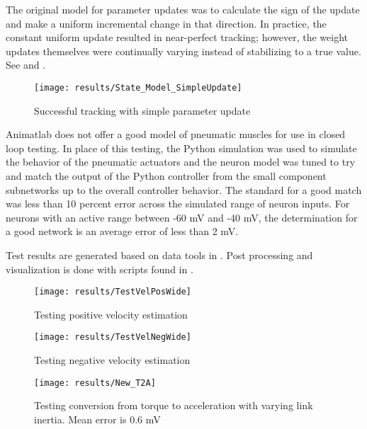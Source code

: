 
The original model for parameter updates was to calculate the sign of the update
and make a uniform incremental change in that direction. In practice, the constant uniform update
resulted in near-perfect tracking; however, the weight updates themselves were continually varying instead of stabilizing to a true value. See  and .

\begin{figure}
\centering
\texttt{[image: results/State\_Model\_SimpleUpdate]}
\caption{Successful tracking with simple parameter update}
\label{fig:StateUpdateSimple}
\end{figure}


Animatlab does not offer a good model of pneumatic muscles for use in closed loop testing. In place of this testing, the Python simulation was used to simulate the behavior of the pneumatic actuators and the neuron model was tuned to try and match the output of the Python controller from the small component subnetworks up to the overall controller behavior. The standard for a good match was less than 10 percent error across the simulated range of neuron inputs. For neurons with an active range between -60 mV and -40 mV, the determination for a good network is an average error of less than 2 mV. 


Test results are generated based on data tools in . Post processing and visualization is done with scripts found in .

\begin{figure}
\centering
\texttt{[image: results/TestVelPosWide]}
\caption{Testing positive velocity estimation}
\label{fig:TestVelPos}
\end{figure}

\begin{figure}
\centering
\texttt{[image: results/TestVelNegWide]}
\caption{Testing negative velocity estimation}
\label{fig:TestVelNeg}
\end{figure}

\begin{figure}
\centering
\texttt{[image: results/New\_T2A]}
\caption{Testing conversion from torque to acceleration with varying link inertia. Mean error is 0.6 mV}
\label{fig:TestAccelInertia}
\end{figure}

